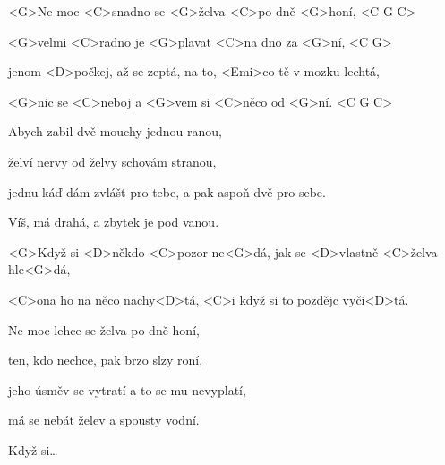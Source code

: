 

\zs
<G>Ne moc <C>snadno se <G>želva <C>po dně <G>honí, <C G C>

<G>velmi <C>radno je <G>plavat <C>na dno za <G>ní, <C G>

jenom <D>počkej, až se zeptá, na to, <Emi>co tě v mozku lechtá,

<G>nic se <C>neboj a <G>vem si <C>něco od <G>ní. <C G C>
\ks

\zs
Abych zabil dvě mouchy jednou ranou,

želví nervy od želvy schovám stranou,

jednu káď dám zvlášť pro tebe, a pak aspoň dvě pro sebe.

Víš, má drahá, a zbytek je pod vanou.
\ks

\zr
<G>Když si <D>někdo <C>pozor ne<G>dá, jak se <D>vlastně <C>želva hle<G>dá,

<C>ona ho na něco nachy<D>tá, <C>i když si to pozdějc 
vyčí<D>tá.
\kr

\zs
Ne moc lehce se želva po dně honí,

ten, kdo nechce, pak brzo slzy roní,

jeho úsměv se vytratí a to se mu nevyplatí,

má se nebát želev a spousty vodní.
\ks

\zr
Když si…
\kr

\kp
